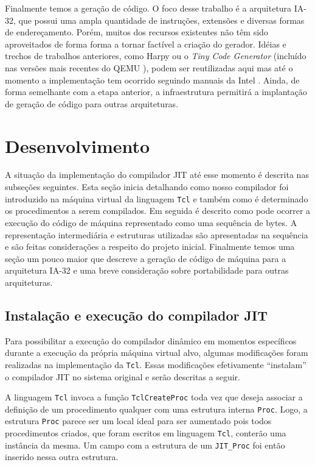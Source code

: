 Finalmente temos a geração de código. O foco desse trabalho é a
arquitetura IA-32, que possui uma ampla quantidade de instruções, extensões e
diversas formas de endereçamento.
Porém, muitos dos recursos existentes não têm sido aproveitados de forma
forma a tornar factível a criação do gerador.
Idéias e trechos de trabalhos anteriores, como Harpy \cite{harpy}
ou o \textit{Tiny Code Generator} (incluído nas versões mais recentes do
QEMU \cite{qemu}), podem ser reutilizadas aqui mas até o momento a
implementação tem ocorrido seguindo manuais da Intel
\cite{intel_aam}\cite{intel_naz}. Ainda, de forma semelhante com a
etapa anterior, a infraestrutura permitirá a implantação de geração de
código para outras arquiteturas.


\section{Desenvolvimento}
\label{desenvolvimento}

A situação da implementação do compilador JIT até esse momento é descrita nas
subseções seguintes. Esta seção inicia detalhando como nosso
compilador foi introduzido na máquina virtual da linguagem \texttt{Tcl} e
também como é determinado os procedimentos a serem compilados. Em
seguida é descrito como pode ocorrer a execução do código de máquina
representado como uma sequência de bytes. A representação
intermediária e estruturas utilizadas são apresentadas na sequência e
são feitas considerações a respeito do projeto inicial. Finalmente
temos uma seção um pouco maior que descreve a geração de código
de máquina para a arquitetura IA-32 e uma breve consideração sobre
portabilidade para outras arquiteturas.


\subsection{Instalação e execução do compilador JIT}
\label{install-exec}
Para possibilitar a execução do compilador dinâmico em momentos
específicos durante a execução da própria máquina virtual alvo, algumas
modificações foram realizadas na implementação da
\texttt{Tcl}. Essas modificações efetivamente ``instalam'' o
compilador JIT no sistema original e serão descritas a seguir.

A linguagem \texttt{Tcl} invoca a função \verb!TclCreateProc! toda vez
que deseja associar a definição de um procedimento qualquer com uma
estrutura interna \verb!Proc!. Logo, a estrutura \verb!Proc! parece
ser um local ideal para ser aumentado pois todos procedimentos
criados, que foram escritos em linguagem \texttt{Tcl}, conterão uma
instância da mesma. Um campo com a estrutura de um
\verb!JIT_Proc! foi então inserido nessa outra estrutura.

